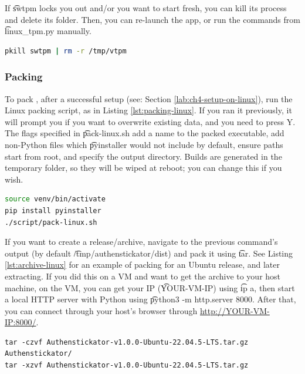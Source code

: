 If \t{swtpm} locks you out and/or you want to start fresh, you can kill its process and delete its folder.
Then, you can re-launch the app, or run the commands from \t{linux\_tpm.py} manually.
\begin{lstlisting}[language=bash]
pkill swtpm | rm -r /tmp/vtpm
\end{lstlisting}



\subsubsection{Packing} \label{lab:ch4-packing-linux}

To pack \app{}, after a successful setup (see: Section \ref{lab:ch4-setup-on-linux}), run the Linux packing script, as in Listing \ref{lst:packing-linux}.
If you ran it previously, it will prompt you if you want to overwrite existing data, and you need to press Y.
The flags specified in \t{pack-linux.sh} add a name to the packed executable, add non-Python files which \t{pyinstaller} would not include by default, ensure paths start from root, and specify the output directory.
Builds are generated in the temporary folder, so they will be wiped at reboot; you can change this if you wish.

\enlargethispage{-\baselineskip}


\begin{lstlisting}[language=bash, label={lst:packing-linux}, caption={Running the packing script for Linux.}]
source venv/bin/activate
pip install pyinstaller
./script/pack-linux.sh
\end{lstlisting}

If you want to create a release/archive, navigate to the previous command's output (by default \t{/tmp/authenstickator/dist}) and pack it using \t{tar}.
See Listing \ref{lst:archive-linux} for an example of packing for an Ubuntu release, and later extracting.
If you did this on a VM and want to get the archive to your host machine, on the VM, you can get your IP (\t{YOUR-VM-IP}) using \t{ip a}, then start a local HTTP server with Python using \t{python3 -m http.server 8000}.
After that, you can connect through your host's browser through \url{http://YOUR-VM-IP:8000/}.

\begin{lstlisting}[label={lst:archive-linux}, caption={Create archive and extract on Linux.}]
tar -czvf Authenstickator-v1.0.0-Ubuntu-22.04.5-LTS.tar.gz Authenstickator/
tar -xzvf Authenstickator-v1.0.0-Ubuntu-22.04.5-LTS.tar.gz
\end{lstlisting}

